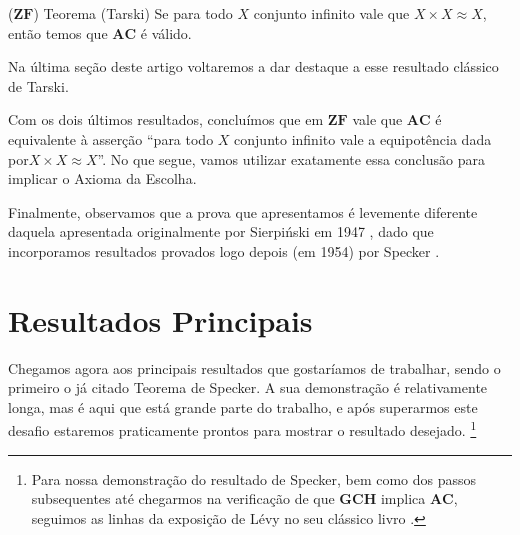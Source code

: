 \documentclass{hipatia}
\newcommand{\gch}{\mathbf{GCH}}
\newcommand{\ac}{\mathbf{AC}}
\newcommand{\zf}{\mathbf{ZF}}
\begin{document}
\begin{teoremacaixa*}{($\zf$) Teorema (Tarski)
\cite{Tarski}} Se para todo $X$ conjunto infinito vale que\linebreak
$X\times X\approx X$, então temos que $\ac$ é válido.
\end{teoremacaixa*}

Na última seção deste artigo voltaremos a dar destaque a
esse resultado clássico de Tarski. 

Com os dois últimos resultados, concluímos que em $\zf$
vale que $\ac$ é equivalente à asserção ``para todo $X$
conjunto infinito vale a equipotência dada por\linebreak  $X\times
X\approx X$''. No que segue, vamos utilizar exatamente
essa conclusão para implicar o Axioma da Escolha.

Finalmente, observamos que a prova que apresentamos é
levemente diferente daquela apresentada originalmente por
Sierpi\'nski em 1947 \cite{Sierp}, dado que incorporamos
resultados provados logo depois (em 1954) por Specker
\cite{Specker}.






\section{Resultados Principais}

Chegamos agora aos principais resultados que gostaríamos
de trabalhar, sendo o primeiro o já citado Teorema de
Specker. A sua demonstração é relativamente longa, mas é
aqui que está grande parte do trabalho, e após superarmos
este desafio estaremos praticamente prontos para mostrar o
resultado desejado. \footnote{Para nossa demonstração do
resultado de Specker, bem como dos passos subsequentes até
chegarmos na verificação de que $\gch$ implica $\ac$,
seguimos as linhas da exposição de Lévy no seu clássico
livro \cite{Levy}.}
\end{document}
